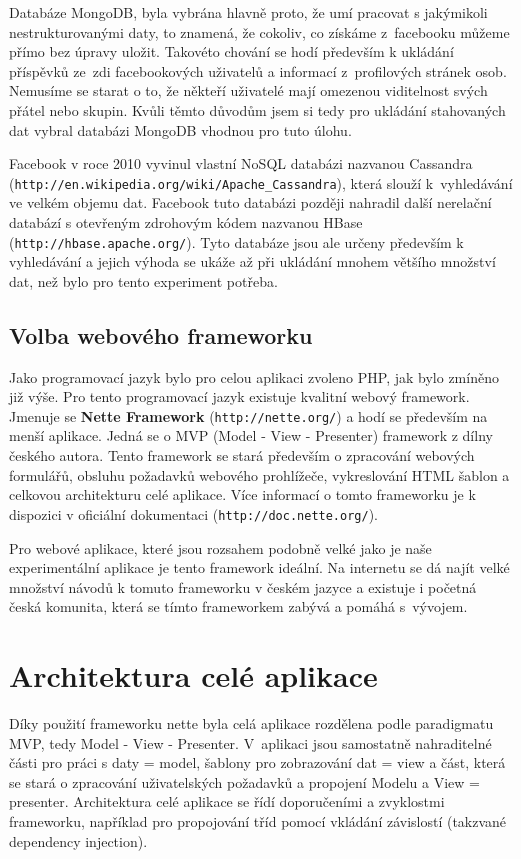 \documentclass[thesis=M,czech]{FITthesis}[2013/05/10]
\begin{document}
Databáze MongoDB, byla vybrána hlavně proto, že umí pracovat s jakýmikoli nestrukturovanými daty, to znamená, že cokoliv, co získáme z~facebooku můžeme přímo bez úpravy uložit. Takovéto chování se hodí především k ukládání příspěvků ze~zdi facebookových uživatelů a informací z~profilových stránek osob. Nemusíme se starat o to, že někteří uživatelé mají omezenou viditelnost svých přátel nebo skupin. Kvůli těmto důvodům jsem si tedy pro ukládání stahovaných dat vybral databázi MongoDB vhodnou pro tuto úlohu.

Facebook v roce 2010 vyvinul vlastní NoSQL databázi nazvanou Cassandra (\verb|http://en.wikipedia.org/wiki/Apache_Cassandra|), která  slouží k~vyhledávání ve velkém objemu dat. Facebook tuto databázi později nahradil další nerelační databází  s otevřeným zdrohovým kódem nazvanou HBase (\verb|http://hbase.apache.org/|). Tyto databáze jsou ale určeny především k vyhledávání a jejich výhoda se ukáže až při ukládání mnohem většího množství dat, než bylo pro tento experiment potřeba.

\subsection{Volba webového frameworku}

Jako programovací jazyk bylo pro celou aplikaci zvoleno PHP, jak bylo zmíněno již výše. Pro tento programovací jazyk existuje kvalitní webový framework. Jmenuje se \textbf{Nette Framework} (\verb|http://nette.org/|) a hodí se především na menší aplikace. Jedná se o MVP (Model - View - Presenter) framework z dílny českého autora. Tento framework se stará především o zpracování webových formulářů, obsluhu požadavků webového prohlížeče, vykreslování HTML šablon a celkovou architekturu celé aplikace. Více informací o tomto frameworku je k dispozici v oficiální dokumentaci (\verb|http://doc.nette.org/|). 

Pro webové aplikace, které jsou rozsahem podobně velké jako je naše experimentální aplikace je tento framework ideální. Na internetu se dá najít velké množství návodů k tomuto frameworku v českém jazyce a existuje i početná česká komunita, která se tímto frameworkem zabývá a pomáhá s~vývojem. 


\section{Architektura celé aplikace}

Díky použití frameworku nette byla celá aplikace rozdělena podle paradigmatu MVP, tedy Model - View - Presenter. V~aplikaci jsou samostatně nahraditelné části pro práci s daty = model, šablony pro zobrazování dat = view a část, která se stará o zpracování uživatelských požadavků a propojení Modelu a View = presenter. Architektura celé aplikace se řídí doporučeními a zvyklostmi frameworku, například pro propojování tříd pomocí vkládání závislostí (takzvané dependency injection).
\end{document}
